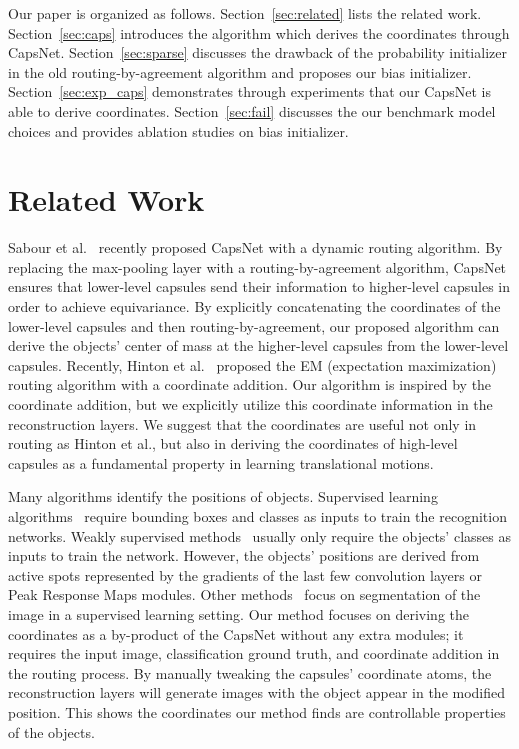 \documentclass{article}
\begin{document}
Our paper is organized as follows. Section~\ref{sec:related} lists the related work. Section~\ref{sec:caps} introduces the algorithm which derives the coordinates through CapsNet. Section~\ref{sec:sparse} discusses the drawback of the probability initializer in the old routing-by-agreement algorithm and proposes our bias initializer. Section~\ref{sec:exp_caps} demonstrates through experiments that our CapsNet is able to derive coordinates. Section~\ref{sec:fail} discusses the our benchmark model choices and provides ablation studies on bias initializer. 

\section{Related Work \label{sec:related}}
Sabour et al.~\cite{sabour2017dynamic} recently proposed CapsNet with a dynamic routing algorithm. By replacing the max-pooling layer with a routing-by-agreement algorithm, CapsNet ensures that lower-level capsules send their information to higher-level capsules in order to achieve equivariance. By explicitly concatenating the coordinates of the lower-level capsules and then routing-by-agreement, our proposed algorithm can derive the objects' center of mass at the higher-level capsules from the lower-level capsules. Recently, Hinton et al.~\cite{46653} proposed the EM (expectation maximization) routing algorithm with a coordinate addition. Our algorithm is inspired by the coordinate addition, but we explicitly utilize this coordinate information in the reconstruction layers. We suggest that the coordinates are useful not only in routing as Hinton et al.\mentioned, but also in deriving the coordinates of high-level capsules as a fundamental property in learning translational motions. 

Many algorithms identify the positions of objects. Supervised learning algorithms~\cite{liu2016ssd,redmon2016you,ren2015faster} require bounding boxes and classes as inputs to train the recognition networks. Weakly supervised methods~\cite{selvaraju2016grad, zhou2018weakly} usually only require the objects' classes as inputs to train the network. However, the objects' positions are derived from active spots represented by the gradients of the last few convolution layers or Peak Response Maps modules. Other methods~\cite{Novotny_2018_ECCV,frohlich2012semantic} focus on segmentation of the image in a supervised learning setting. Our method focuses on deriving the coordinates as a by-product of the CapsNet without any extra modules; it requires the input image, classification ground truth, and coordinate addition in the routing process. By manually tweaking the capsules' coordinate atoms, the reconstruction layers will generate images with the object appear in the modified position. This shows the coordinates our method finds are controllable properties of the objects.
\end{document}
